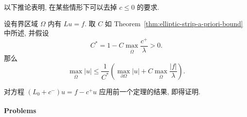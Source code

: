 以下推论表明, 在某些情形下可以去掉 $c\leq0$ 的要求.

\begin{Corollary}
\label{cor:elliptic-small-positive-zero-order}
设有界区域 $\Omega$ 内有 $Lu=f$. 取 $C$ 如 Theorem~\ref{thm:elliptic-strip-a-priori-bound} 中所述, 并假设
\begin{equation}\label{eq:elliptic-positive-zero-order-smallness}
C^*=1-C\max_{\overline\Omega}\dfrac{c^+}{\lambda}>0.
\end{equation}
那么
\begin{equation}\label{eq:elliptic-small-positive-zero-order-bound}
\max_{\overline\Omega}|u|\leq\dfrac1{C^*}\left(\max_{\partial\Omega}|u|+C\max_{\overline\Omega}\dfrac{|f|}{\lambda}\right).
\end{equation}

\end{Corollary}

对方程 $(L_0+c^-)u=f-c^+u$ 应用前一个定理的结果, 即得证明.

\paragraph*{Problems}

